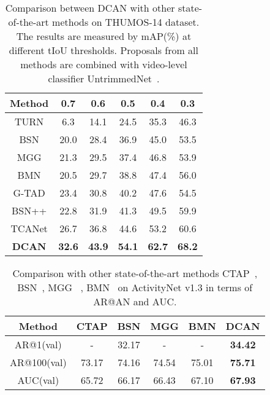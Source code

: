 \documentclass[letterpaper]{article} \usepackage{aaai22}  \usepackage{times}  \usepackage{helvet}  \usepackage{courier}  \usepackage[hyphens]{url}  \usepackage{graphicx} \urlstyle{rm} \def\UrlFont{\rm}  \usepackage{natbib}  \usepackage{caption} \DeclareCaptionStyle{ruled}{labelfont=normalfont,labelsep=colon,strut=off} \frenchspacing  \setlength{\pdfpagewidth}{8.5in}  \setlength{\pdfpageheight}{11in}  \usepackage{algorithm}
\begin{document}
\begin{table}[!t]
\centering
\caption{Comparison between DCAN with other state-of-the-art methods on THUMOS-14 dataset. The results are measured by mAP(\%) at different tIoU thresholds. Proposals from all methods are combined with video-level classifier UntrimmedNet~\cite{untrimmednet}.}
\label{table:thumos-map}
\begin{tabular}{c|ccccc}
\toprule
\textbf{Method}  & \textbf{0.7} & \textbf{0.6} & \textbf{0.5} & \textbf{0.4} & \textbf{0.3} \\ 
\midrule
TURN &  6.3 & 14.1 & 24.5 & 35.3 & 46.3 \\
BSN &  20.0 & 28.4 & 36.9 & 45.0 & 53.5 \\
MGG &  21.3 & 29.5 & 37.4 & 46.8 & 53.9 \\
BMN &  20.5 & 29.7 & 38.8 & 47.4 & 56.0 \\
G-TAD &  23.4 & 30.8 & 40.2 & 47.6 & 54.5 \\
BSN++ &  22.8 & 31.9 & 41.3 & 49.5 & 59.9 \\
TCANet &  26.7 & 36.8 & 44.6 & 53.2 & 60.6 \\
\midrule
\textbf{DCAN} &  \textbf{32.6} & \textbf{43.9} & \textbf{54.1} & \textbf{62.7} & \textbf{68.2} \\ 
\bottomrule
\end{tabular}
\end{table}


\begin{table}[t]
\centering
\caption{Comparison with other state-of-the-art methods CTAP~\cite{ctap}, BSN~\cite{bsn}, MGG ~\cite{mgg}, BMN~\cite{bmn} on ActivityNet v1.3 in terms of AR@AN and AUC.}
\label{table:anet1.3-proposal}
\begin{tabular}{c|ccccc}
\toprule
Method & CTAP & BSN & MGG & BMN & DCAN \\ \midrule
AR@1(val) & - & 32.17 & - & - & \textbf{34.42} \\
AR@100(val) & 73.17 & 74.16 & 74.54 & 75.01 & \textbf{75.71} \\
AUC(val) & 65.72 & 66.17 & 66.43 & 67.10 & \textbf{67.93} \\
\bottomrule
\end{tabular}
\end{table}
\end{document}
